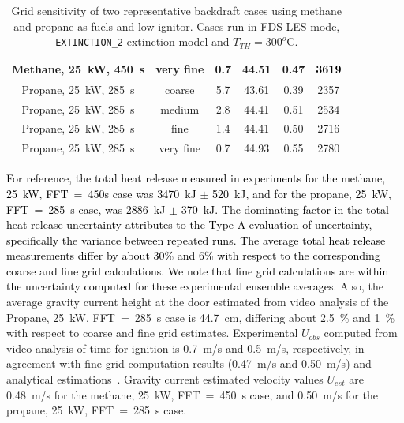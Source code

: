\documentclass[12pt,letterpaper]{article}
\begin{document}
\begin{flushleft}
\begin{table}[]
\begin{tabular}{c|c|c|c|c|c}
    Methane, 25~kW, 450~s & very fine &           0.7 &      44.51        &     0.47      &  \textcolor{black}{3619}         \\ %
    \hline
    Propane, 25~kW, 285~s & coarse   &           5.7 &      43.61         &    0.39       &   2357   \\ %
    Propane, 25~kW, 285~s & medium   &           2.8 &      44.41         &    0.51       &   2534   \\ %
    Propane, 25~kW, 285~s & fine     &           1.4 &      44.41         &    0.50       &   2716   \\ %
    Propane, 25~kW, 285~s & very fine &           0.7 &      44.93         &    0.55       &   2780   \\ %
    \hline
    \end{tabular}
    \caption{Grid sensitivity of two representative backdraft cases using methane and propane as fuels and low ignitor. Cases run in FDS LES mode, \texttt{EXTINCTION\_2} extinction model and $T_{TH}=300^o$C.}
    \label{tab:grid_sens}
\end{table}

\textcolor{black}{For reference, the total heat release measured in experiments for the methane, 25~kW, FFT~=~450s case was 3470~kJ $\pm$ 520~kJ, and for the propane, 25~kW, FFT~=~285~s case, was 2886~kJ $\pm$ 370~kJ. The dominating factor in the total heat release uncertainty attributes to the Type A evaluation of uncertainty, specifically the variance between repeated runs. The average total heat release measurements differ by about 30\% and 6\% with respect to the corresponding coarse and fine grid calculations. We note that fine grid calculations are within the uncertainty computed for these experimental ensemble averages}. Also, the average gravity current height at the door estimated from video analysis of the Propane, 25~kW, FFT~=~285~s case is 44.7~cm, differing about 2.5~\% and 1~\% with respect to coarse and fine grid estimates. Experimental $U_{obs}$ computed from video analysis of time for ignition is 0.7~m/s and 0.5~m/s, respectively, in agreement with fine grid computation results (0.47~m/s and 0.50~m/s) and analytical estimations~\cite{fleischmann1993backdraft}. Gravity current estimated velocity values $U_{est}$ are 0.48~m/s for the methane, 25~kW, FFT~=~450~s case, and 0.50~m/s for the propane, 25~kW, FFT~=~285~s case. 


\end{flushleft}
\end{document}
